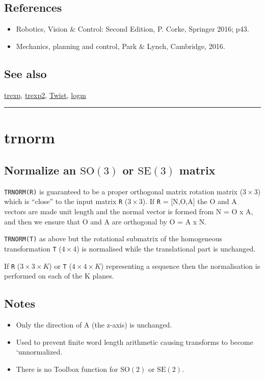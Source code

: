 \subsection*{References}
\begin{itemize}
  \item Robotics, Vision \& Control: Second Edition, P. Corke, Springer 2016; p43.
  \item Mechanics, planning and control, Park \& Lynch, Cambridge, 2016.
\end{itemize}

\subsection*{See also}


\hyperlink{trexp}{\color{blue} trexp}, \hyperlink{trexp2}{\color{blue} trexp2}, \hyperlink{Twist}{\color{blue} Twist}, \hyperlink{logm}{\color{blue} logm}

\vspace{1.5ex}\rule{\textwidth}{1mm}

\hypertarget{trnorm}{\section*{trnorm}}
\subsection*{Normalize an $\mbox{SO}(3)$ or $\mbox{SE}(3)$ matrix}


\texttt{TRNORM(R)} is guaranteed to be a proper orthogonal matrix rotation
matrix ($3 \times 3$) which is ``close'' to the input matrix \texttt{R} ($3 \times 3$). If \texttt{R}
= [N,O,A] the O and A vectors are made unit length and the normal vector
is formed from N = O x A, and then we ensure that O and A are orthogonal
by O = A x N.



\texttt{TRNORM(T)} as above but the rotational submatrix of the homogeneous
transformation \texttt{T} ($4 \times 4$) is normalised while the translational part is
unchanged.



If \texttt{R} ($3 \times 3 \times K$) or \texttt{T} ($4 \times 4 \times K$) representing a sequence then the normalisation
is performed on each of the K planes.


\subsection*{Notes}
\begin{itemize}
  \item Only the direction of A (the z-axis) is unchanged.
  \item Used to prevent finite word length arithmetic causing transforms to    become `unnormalized\textquotesingle .
  \item There is no Toolbox function for $\mbox{SO}(2)$ or $\mbox{SE}(2)$.
\end{itemize}

